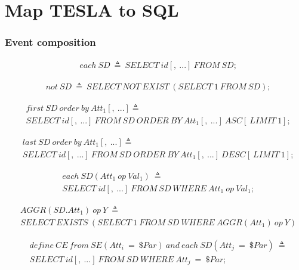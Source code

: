 \chapter{Map TESLA to SQL}

\subsection{Event composition}
\begin{align*}%
&each\ SD\ \triangleq\ SELECT\ id[,\ ...]\ FROM\ SD;
\end{align*}

\begin{align*}%
&not\ SD\ \triangleq\ SELECT\ NOT\ EXIST\ (SELECT\ 1\ FROM\ SD);
\end{align*}

\begin{align*}%
&first\ SD\ order\ by\ Att_1[,\ ...]\triangleq\\
&SELECT\ id[,\ ...]\ FROM\ SD\ ORDER\ BY\ Att_1[,\ ...]\ ASC[\ LIMIT\ 1];
\end{align*}

\begin{align*}%
&last\ SD\ order\ by\ Att_1[,\ ...]\triangleq\\
&SELECT\ id[,\ ...]\ FROM\ SD\ ORDER\ BY\ Att_1[,\ ...]\ DESC[\ LIMIT\ 1];
\end{align*}

\begin{align*}%
&each\ SD(Att_1\ op \ Val_1)\ \triangleq\\
&SELECT\ id[,\ ...]\ FROM\ SD\ WHERE\ Att_1\ op\ Val_1;
\end{align*}

\begin{align*}%
&AGGR(SD.Att_1)\ op\ Y\ \triangleq\\
&SELECT\ EXISTS\ (SELECT\ 1\ FROM\ SD\ WHERE\ AGGR(Att_1)\ op\ Y)
\end{align*}

\begin{align*}%
&define\ CE\ from\ SE(Att_i\ = \ \$Par)\ and\ each\ SD(Att_j\ = \ \$Par)\ \triangleq\\
&SELECT\ id[,\ ...]\ FROM\ SD\ WHERE\ Att_j\ =\ \$Par;
\end{align*}


